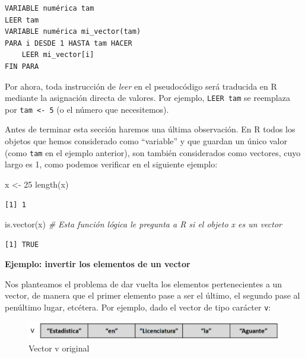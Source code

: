 \documentclass[
]{book}
\newenvironment{Shaded}{\begin{snugshade}}{\end{snugshade}}
\newcommand{\CommentTok}[1]{\textcolor[rgb]{0.56,0.35,0.01}{\textit{#1}}}
\newcommand{\DecValTok}[1]{\textcolor[rgb]{0.00,0.00,0.81}{#1}}
\newcommand{\FunctionTok}[1]{\textcolor[rgb]{0.00,0.00,0.00}{#1}}
\newcommand{\NormalTok}[1]{#1}
\newcommand{\OtherTok}[1]{\textcolor[rgb]{0.56,0.35,0.01}{#1}}
\begin{document}
\begin{verbatim}
VARIABLE numérica tam
LEER tam
VARIABLE numérica mi_vector(tam)
PARA i DESDE 1 HASTA tam HACER
    LEER mi_vector[i]
FIN PARA
\end{verbatim}

Por ahora, toda instrucción de \emph{leer} en el pseudocódigo será traducida en R mediante la asignación directa de valores. Por ejemplo, \texttt{LEER\ tam} se reemplaza por \texttt{tam\ \textless{}-\ 5} (o el número que necesitemos).

Antes de terminar esta sección haremos una última observación. En R todos los objetos que hemos considerado como ``variable'' y que guardan un único valor (como \texttt{tam} en el ejemplo anterior), son también considerados como vectores, cuyo largo es 1, como podemos verificar en el siguiente ejemplo:

\begin{Shaded}
\begin{Highlighting}[]
\NormalTok{x }\OtherTok{\textless{}{-}} \DecValTok{25}
\FunctionTok{length}\NormalTok{(x)}
\end{Highlighting}
\end{Shaded}

\begin{verbatim}
[1] 1
\end{verbatim}

\begin{Shaded}
\begin{Highlighting}[]
\FunctionTok{is.vector}\NormalTok{(x) }\CommentTok{\# Esta función lógica le pregunta a R si el objeto x es un vector}
\end{Highlighting}
\end{Shaded}

\begin{verbatim}
[1] TRUE
\end{verbatim}

\textbf{Ejemplo: invertir los elementos de un vector}

Nos planteamos el problema de dar vuelta los elementos pertenecientes a un vector, de manera que el primer elemento pase a ser el último, el segundo pase al penúltimo lugar, etcétera. Por ejemplo, dado el vector de tipo carácter \texttt{v}:

\begin{figure}

{\centering \includegraphics[width=0.8\linewidth]{images/05_estructuras/estr11} 

}

\caption{Vector v original}\label{fig:inv1}
\end{figure}
\end{document}
